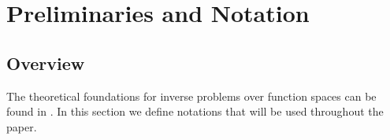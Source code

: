 \documentclass{amsart}
\numberwithin{equation}{section}
\begin{document}

\section{Preliminaries and Notation}\label{section:prelim}

\subsection{Overview}
The theoretical foundations for inverse problems over function spaces
can be found in \cite{Stuart10}. In this section we define notations that will be
  used throughout the paper.
\end{document}

